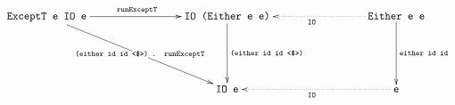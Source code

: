 \documentclass[border=0.5in]{standalone}
\newcommand{\C}{\texttt}
\newcommand{\sC}{\scriptsize\texttt}
\begin{document}
$$
\xymatrix{
    \C{ExceptT e IO e}
      \ar[rrr]^{\sC{runExceptT}}
      \ar[ddrrr]|-{\sC{(either id id <\$>) . runExceptT}}
    & & & \C{IO (Either e e)}
      \ar[dd]^{\sC{(either id id <\$>)}}
    & & & \C{Either e e}
      \ar[dd]^{\sC{either id id}}
      \ar@{.>}[lll]^{\sC{IO}}
    \\ & & & & & & \\
    & & & \texttt{IO e}
    & & & \texttt{e}
      \ar@{.>}[lll]^{\sC{IO}}
}
$$
\end{document}
